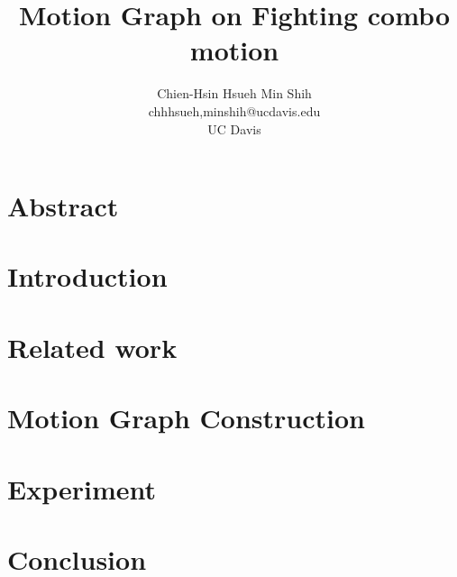 \documentclass[twocolumn, 11pt]{article}  %
\newcommand*{\TitleFont}{%
      \usefont{\encodingdefault}{\rmdefault}{b}{n}%
      \fontsize{16}{20}%
      \selectfont}
\begin{document}

\title{\TitleFont Motion Graph on Fighting combo motion}
\author{Chien-Hsin Hsueh   Min Shih\\chhhsueh,minshih@ucdavis.edu\\UC Davis }
\maketitle


\section{Abstract}


\section{Introduction}


\section{Related work}



\section{Motion Graph Construction}


\section{Experiment}


\section{Conclusion}

\end{document}
